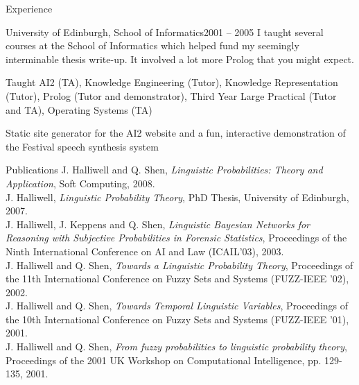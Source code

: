 \documentclass{resume} %
\begin{document}
\begin{rSection}{Experience}
\begin{rSubsection}{University of Edinburgh, School of Informatics}{2001 -- 2005}
{I taught several courses at the School of Informatics which helped fund my seemingly interminable thesis write-up. It involved a lot more Prolog that you might expect.}{}
\item Taught AI2 (TA), Knowledge Engineering (Tutor), Knowledge Representation (Tutor), Prolog (Tutor and demonstrator), Third Year Large Practical (Tutor and TA), Operating Systems (TA)
\item Static site generator for the AI2 website and a fun, interactive demonstration of the Festival speech synthesis system
\end{rSubsection}

\end{rSection}





\begin{rSection}{Publications}
J. Halliwell and Q. Shen, {\em Linguistic Probabilities: Theory and Application}, Soft Computing, 2008.\\
J. Halliwell, {\em Linguistic Probability Theory}, PhD Thesis, University of Edinburgh, 2007.\\
J. Halliwell, J. Keppens and Q. Shen, {\em Linguistic Bayesian Networks for Reasoning with
Subjective Probabilities in Forensic Statistics}, Proceedings of the Ninth International
Conference on AI and Law (ICAIL'03), 2003.\\
J. Halliwell and Q. Shen, {\em Towards a Linguistic Probability Theory}, Proceedings of the
11th International Conference on Fuzzy Sets and Systems (FUZZ-IEEE '02), 2002.\\
J. Halliwell and Q. Shen, {\em Towards Temporal Linguistic Variables}, Proceedings of the
10th International Conference on Fuzzy Sets and Systems (FUZZ-IEEE '01), 2001.\\
J. Halliwell and Q. Shen, {\em From fuzzy probabilities to linguistic probability theory},
Proceedings of the 2001 UK Workshop on Computational Intelligence, pp. 129-135,
2001.\\
\end{rSection}


\end{document}
